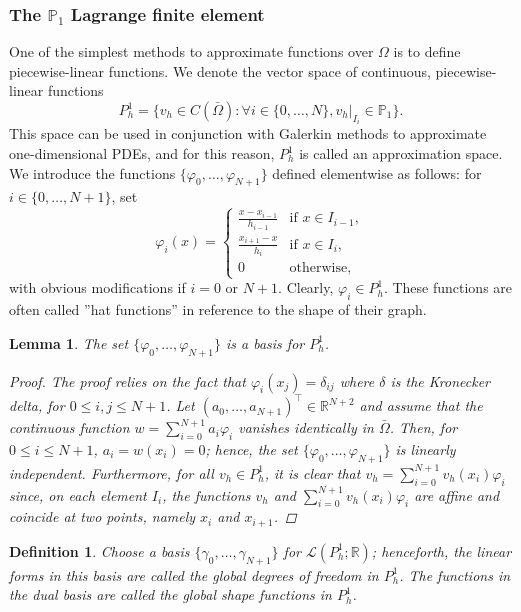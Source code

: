 \documentclass{article}
\newtheorem{definition}{Definition}
\newtheorem{lemma}{Lemma}
\begin{document}
\subsubsection{The $\mathbb{P}_1$ Lagrange finite element}
One of the simplest methods to approximate functions over $\Omega$ is to define piecewise-linear functions. We denote the vector space of continuous, piecewise-linear functions
$$ P_h^1 = \{ v_h \in C(\bar{\Omega}): \forall i \in \{0, \dots, N\}, v_h|_{I_i} \in \mathbb{P}_1 \}.$$
This space can be used in conjunction with Galerkin methods to approximate one-dimensional PDEs, and for this reason, $P_h^1$ is called an approximation space.
We introduce the functions $\{\varphi_0, \dots, \varphi_{N+1}\}$ defined elementwise as follows: for $i \in \{0, \dots, N+1\}$, set
$$ \varphi_i(x) = \begin{cases} \frac{x - x_{i-1}}{h_{i-1}} & \text{if } x \in I_{i-1}, \\ \frac{x_{i+1} - x}{h_i} & \text{if } x \in I_i, \\ 0 & \text{otherwise}, \end{cases} $$
with obvious modifications if $i = 0$ or $N+1$. Clearly, $\varphi_i \in P_h^1$. These functions are often called ''hat functions'' in reference to the shape of their graph.
\begin{lemma} \label{hatbasis}
    The set $\{\varphi_0, \dots, \varphi_{N+1}\}$ is a basis for $P_h^1$.
    \begin{proof}
        The proof relies on the fact that $\varphi_i(x_j) = \delta_{ij}$ where $\delta$ is the Kronecker delta, for $0 \le i,j \le N+1$. Let $(a_0, \dots, a_{N+1})^\top \in \mathbb{R}^{N+2}$ and assume that the continuous function $w = \sum_{i=0}^{N+1} a_i \varphi_i$ vanishes identically in $\bar{\Omega}$. Then, for $0 \le i \le N+1$, $a_i = w(x_i) = 0$; hence, the set $\{\varphi_0, \dots, \varphi_{N+1}\}$ is linearly independent. Furthermore, for all $v_h \in P_h^1$, it is clear that $v_h = \sum_{i=0}^{N+1} v_h(x_i) \varphi_i$ since, on each element $I_i$, the functions $v_h$ and $\sum_{i=0}^{N+1} v_h(x_i) \varphi_i$ are affine and coincide at two points, namely $x_i$ and $x_{i+1}$.
    \end{proof}
\end{lemma}
\begin{definition}
    Choose a basis $\{\gamma_0, \dots, \gamma_{N+1}\}$ for $\mathcal{L}(P_h^1;\mathbb{R})$; henceforth, the linear forms in this basis are called the global degrees of freedom in $P_h^1$. The functions in the dual basis are called the global shape functions in $P_h^1$. 
\end{definition}
\end{document}
